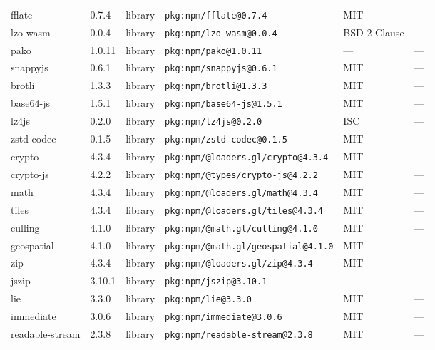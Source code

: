 \documentclass[11pt,a4paper]{article}
\begin{document}
\begin{longtable}{|p{4cm}|p{2cm}|p{1.6cm}|p{5cm}|p{1.5cm}|p{3.5cm}|}
\raggedright fflate & 0.7.4 & library & \small\texttt{pkg:npm/fflate@0.7.4} & MIT & \small — \\
\raggedright lzo-wasm & 0.0.4 & library & \small\texttt{pkg:npm/lzo-wasm@0.0.4} & BSD-2-Clause & \small — \\
\raggedright pako & 1.0.11 & library & \small\texttt{pkg:npm/pako@1.0.11} & — & \small — \\
\raggedright snappyjs & 0.6.1 & library & \small\texttt{pkg:npm/snappyjs@0.6.1} & MIT & \small — \\
\raggedright brotli & 1.3.3 & library & \small\texttt{pkg:npm/brotli@1.3.3} & MIT & \small — \\
\raggedright base64-js & 1.5.1 & library & \small\texttt{pkg:npm/base64-js@1.5.1} & MIT & \small — \\
\raggedright lz4js & 0.2.0 & library & \small\texttt{pkg:npm/lz4js@0.2.0} & ISC & \small — \\
\raggedright zstd-codec & 0.1.5 & library & \small\texttt{pkg:npm/zstd-codec@0.1.5} & MIT & \small — \\
\raggedright crypto & 4.3.4 & library & \small\texttt{pkg:npm/@loaders.gl/crypto@4.3.4} & MIT & \small — \\
\raggedright crypto-js & 4.2.2 & library & \small\texttt{pkg:npm/@types/crypto-js@4.2.2} & MIT & \small — \\
\raggedright math & 4.3.4 & library & \small\texttt{pkg:npm/@loaders.gl/math@4.3.4} & MIT & \small — \\
\raggedright tiles & 4.3.4 & library & \small\texttt{pkg:npm/@loaders.gl/tiles@4.3.4} & MIT & \small — \\
\raggedright culling & 4.1.0 & library & \small\texttt{pkg:npm/@math.gl/culling@4.1.0} & MIT & \small — \\
\raggedright geospatial & 4.1.0 & library & \small\texttt{pkg:npm/@math.gl/geospatial@4.1.0} & MIT & \small — \\
\raggedright zip & 4.3.4 & library & \small\texttt{pkg:npm/@loaders.gl/zip@4.3.4} & MIT & \small — \\
\raggedright jszip & 3.10.1 & library & \small\texttt{pkg:npm/jszip@3.10.1} & — & \small — \\
\raggedright lie & 3.3.0 & library & \small\texttt{pkg:npm/lie@3.3.0} & MIT & \small — \\
\raggedright immediate & 3.0.6 & library & \small\texttt{pkg:npm/immediate@3.0.6} & MIT & \small — \\
\raggedright readable-stream & 2.3.8 & library & \small\texttt{pkg:npm/readable-stream@2.3.8} & MIT & \small — \\

\end{longtable}
\end{document}
